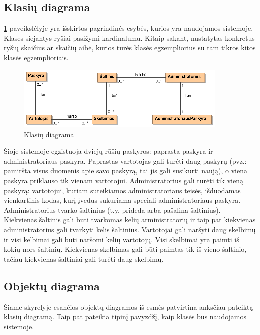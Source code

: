 \documentclass[12pt]{article}
\begin{document}
	\subsection{Klasių diagrama}
	
	 \ref{ClassDiagram} paveikslėlyje yra išskirtos pagrindinės esybės, kurios yra naudojamos sistemoje. Klases siejantys ryšiai pasižymi kardinalumu. Kitaip sakant, nustatytas konkretus ryšių skaičius ar skaičių aibė, kurios turės klasės egzempliorius su tam tikros kitos klasės egzemplioriais.
	
	\begin{figure}[h]
		\begin{center}
			\includegraphics[width=0.9\textwidth]{KlasiuDiagrama.eps}
			\caption{Klasių diagrama\label{ClassDiagram}}
		\end{center}
	\end{figure}
	
	Šioje sistemoje egzistuoja dviejų rūšių paskyros: paprasta paskyra ir administratoriaus paskyra. Paprastas vartotojas gali turėti daug paskyrų (pvz.: pamiršta visus duomenis apie savo paskyrą, tai jis gali susikurti naują), o viena paskyra priklauso tik vienam vartotojui. Administratorius gali turėti tik vieną paskyrą: vartotojui, kuriam suteikiamos administratoriaus teisės, išduodamas vienkartinis kodas, kurį įvedus sukuriama speciali administratoriaus paskyra. Administratorius tvarko šaltinius (t.y. prideda arba pašalina šaltinius). Kiekvienas šaltinis gali būti tvarkomas kelių arministratorių ir taip pat kiekvienas administratorius gali tvarkyti kelis šaltinius. Vartotojai gali naršyti daug skelbimų ir visi kelbimai gali būti naršomi kelių vartotojų. Visi skelbimai yra paimti iš kokių nors šaltinių. Kiekvienas skelbimas gali būti paimtas tik iš vieno šaltinio, tačiau kiekvienas šaltiniai gali turėti daug skelbimų.
	\pagebreak
	
	\subsection{Objektų diagrama}
	
	Šiame skyrelyje esančios objektų diagramos iš esmės patvirtina anksčiau pateiktą klasių diagramą. Taip pat pateikia tipinį pavyzdžį, kaip klasės bus naudojamos sistemoje.
	
\end{document}

